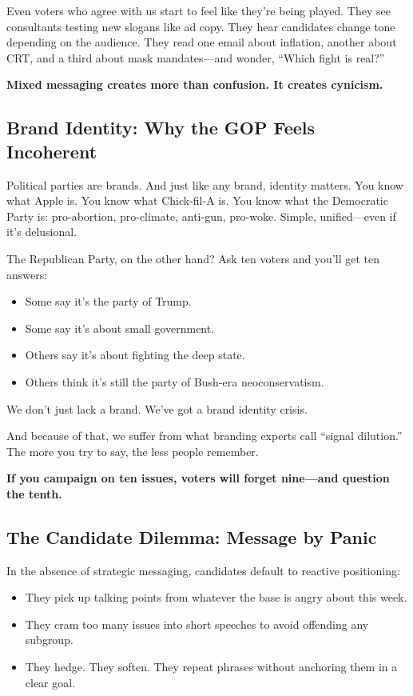 Even voters who agree with us start to feel like they’re being played. They see consultants testing new slogans like ad copy. They hear candidates change tone depending on the audience. They read one email about inflation, another about CRT, and a third about mask mandates—and wonder, “Which fight is real?”

\textbf{Mixed messaging creates more than confusion. It creates cynicism.}

\subsection*{Brand Identity: Why the GOP Feels Incoherent}

Political parties are brands. And just like any brand, identity matters. You know what Apple is. You know what Chick-fil-A is. You know what the Democratic Party is: pro-abortion, pro-climate, anti-gun, pro-woke. Simple, unified—even if it’s delusional.

The Republican Party, on the other hand? Ask ten voters and you’ll get ten answers:
\begin{itemize}
    \item Some say it’s the party of Trump.
    \item Some say it’s about small government.
    \item Others say it’s about fighting the deep state.
    \item Others think it’s still the party of Bush-era neoconservatism.
\end{itemize}

We don’t just lack a brand. We’ve got a brand identity crisis.

And because of that, we suffer from what branding experts call “signal dilution.” The more you try to say, the less people remember.

\textbf{If you campaign on ten issues, voters will forget nine—and question the tenth.}

\subsection*{The Candidate Dilemma: Message by Panic}

In the absence of strategic messaging, candidates default to reactive positioning:
\begin{itemize}
    \item They pick up talking points from whatever the base is angry about this week.
    \item They cram too many issues into short speeches to avoid offending any subgroup.
    \item They hedge. They soften. They repeat phrases without anchoring them in a clear goal.
\end{itemize}

